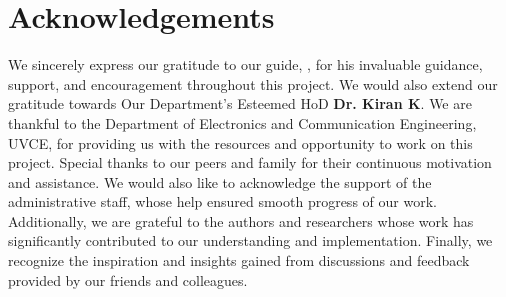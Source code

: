 \chapter*{Acknowledgements}

\vspace{10mm}

 We sincerely express our gratitude to our guide, \textbf{\supervisorA}, for his invaluable guidance, support, and encouragement throughout this project. We would also extend our gratitude towards Our Department's Esteemed HoD \textbf{Dr. Kiran K}. We are thankful to the Department of Electronics and Communication Engineering, UVCE, for providing us with the resources and opportunity to work on this project. Special thanks to our peers and family for their continuous motivation and assistance. We would also like to acknowledge the support of the administrative staff, whose help ensured smooth progress of our work. Additionally, we are grateful to the authors and researchers whose work has significantly contributed to our understanding and implementation. Finally, we recognize the inspiration and insights gained from discussions and feedback provided by our friends and colleagues. 
